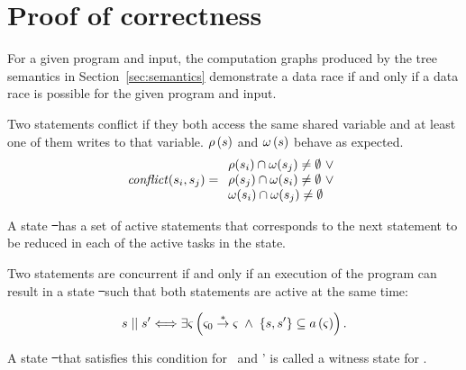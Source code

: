 \section{Proof of correctness}
\label{sec:proof}

For a given program and input, the computation graphs produced by the
tree semantics in Section~\ref{sec:semantics} demonstrate a data race
if and only if a data race is possible for the given program and
input.

\begin{comment}
\begin{definition}\label{def:scheduler}
A scheduler is a program capable of deciding which task to reduce,
given a tree configuration.
\end{definition}
\end{comment}

\begin{definition}
Two statements conflict if they both access the same shared variable
and at least one of them writes to that variable.
$\rho\left(s\right)$ and $\omega\left(s\right)$ behave
as expected.
\begin{gather*}
\mathit{conflict}(s_i,s_j) =
\begin{array}{l}
  \rho(s_i) \cap \omega(s_j) \neq \emptyset\ \vee \\
  \rho(s_j) \cap \omega(s_i) \neq \emptyset\ \vee \\
  \omega(s_i) \cap \omega(s_j) \neq \emptyset\ \\
\end{array}
\end{gather*}
\end{definition}

\begin{definition}
A state \st\ has a set of active statements \activestatements{\st}
that corresponds to the next statement to be reduced in each of the
active tasks in the state.
\end{definition}

\begin{definition}[Concurrency]
Two statements are concurrent if and only if an execution of the
program can result in a state \st\ such that both statements are
active at the same time:

\begin{gather*}
s \mid\mid s' \Longleftrightarrow \exists \varsigma \left(\varsigma_{0}
\overset{*}{\rightarrow} \varsigma \; \wedge \; \left\{s,
s'\right\} \subseteq a\left(\varsigma\right)\right) .
\end{gather*}

A state \st\ that satisfies this condition for \statement\ and
\statement' is called a witness state for
.
\end{definition}


